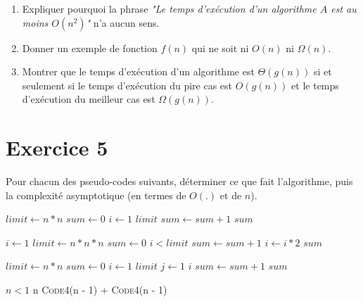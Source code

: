 \documentclass[a4paper,10pt]{article}
\begin{document}
\begin{enumerate}

\item Expliquer pourquoi la phrase \textit{"Le temps d'exécution d'un algorithme $A$ est au moins $O(n^2)$"} n'a aucun sens.

\item Donner un exemple de fonction $f(n)$ qui ne soit ni $O(n)$ ni $\Omega(n)$.

\item Montrer que le temps d'exécution d'un algorithme est $\Theta(g(n))$ si et seulement si le temps d'exécution du pire cas est $O(g(n))$ et le temps d'exécution du meilleur cas est $\Omega(g(n))$.

\end{enumerate}

\section*{Exercice 5}

Pour chacun des pseudo-codes suivants, déterminer ce que fait l'algorithme, puis
la complexité asymptotique (en termes de $O(.)$ et de $n$).

\vspace{10pt}
\begin{codebox}
    \li $limit\gets n*n$
    \li $sum\gets 0$
    \li \For $i\gets 1$ \To $limit$
    \li \Do $sum\gets sum+1$
        \End
    \li \Return $sum$
    \End
\end{codebox}
\vspace{10pt}

\begin{codebox}
    \li $i\gets 1$
    \li $limit\gets n*n*n$
    \li $sum\gets 0$
    \li \While $i < limit$
    \li \Do $sum\gets sum+1$
    \li     $i\gets i*2$
        \End
    \li \Return $sum$
    \End
\end{codebox}
\vspace{10pt}

\begin{codebox}
    \li $limit\gets n*n$
    \li $sum\gets 0$
    \li \For $i\gets 1$ \To $limit$
    \li \Do \For $j\gets 1$ \To $i$
    \li     \Do $sum\gets sum+1$
            \End
        \End
    \li \Return $sum$
    \End
\end{codebox}
\vspace{10pt}

\begin{codebox}
    \li \If $n < 1$
        \Then
    \li     \Return n
    \li \Else
    \li     \Return \textsc{Code4}(n - 1) + \textsc{Code4}(n - 1)
       \End
\end{codebox}
\vspace{10pt}
\end{document}
